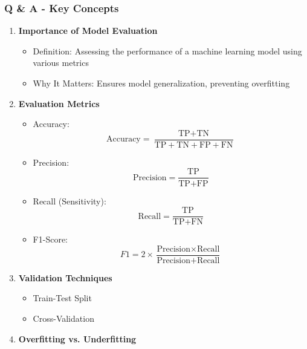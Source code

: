 \documentclass[aspectratio=169]{beamer}
\begin{document}
\begin{frame}[fragile]
    \frametitle{Q \& A - Key Concepts}
    \begin{enumerate}
        \item \textbf{Importance of Model Evaluation}
            \begin{itemize}
                \item Definition: Assessing the performance of a machine learning model using various metrics
                \item Why It Matters: Ensures model generalization, preventing overfitting
            \end{itemize}
            
        \item \textbf{Evaluation Metrics}
            \begin{itemize}
                \item Accuracy: 
                    \[
                    \text{Accuracy} = \frac{\text{TP} + \text{TN}}{\text{TP} + \text{TN} + \text{FP} + \text{FN}}
                    \]
                \item Precision: 
                    \[
                    \text{Precision} = \frac{\text{TP}}{\text{TP} + \text{FP}}
                    \]
                \item Recall (Sensitivity): 
                    \[
                    \text{Recall} = \frac{\text{TP}}{\text{TP} + \text{FN}}
                    \]
                \item F1-Score: 
                    \[
                    F1 = 2 \times \frac{\text{Precision} \times \text{Recall}}{\text{Precision} + \text{Recall}}
                    \]
            \end{itemize}

        \item \textbf{Validation Techniques}
            \begin{itemize}
                \item Train-Test Split
                \item Cross-Validation
            \end{itemize}

        \item \textbf{Overfitting vs. Underfitting}
    \end{enumerate}
\end{frame}
\end{document}
